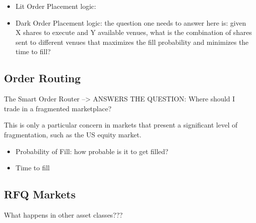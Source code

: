 \begin{itemize}
\item Lit Order Placement logic:

\item Dark Order Placement logic: the question one needs to answer here is: given X shares to execute and Y available venues, what is the combination of shares sent to different venues that maximizes the fill probability and minimizes the time to fill?

\end{itemize}


\subsection{Order Routing}

The Smart Order Router --> ANSWERS THE QUESTION: Where should I trade in a fragmented marketplace?

This is only a particular concern in markets that present a significant level of fragmentation, such as the US equity market. 

\begin{itemize}
\item Probability of Fill: how probable is it to get filled? 

\item Time to fill
\end{itemize}


\subsection{RFQ Markets}
What happens in other asset classes???